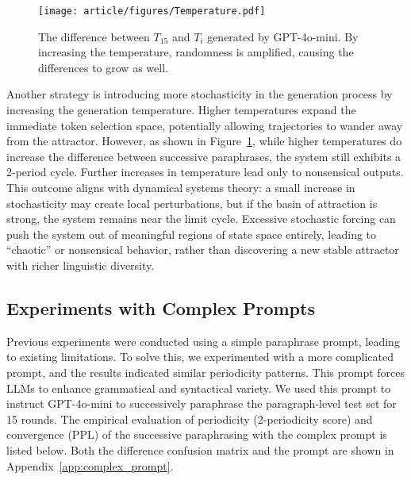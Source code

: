 

\begin{figure}[!h]
    \centering
    \texttt{[image: article/figures/Temperature.pdf]}
    \caption{
    The difference between \(T_{15}\) and \(T_i\) generated by GPT-4o-mini. 
    By increasing the temperature, randomness is amplified, causing the differences to grow as well.
    }    
    \label{figs:Temperature}
\end{figure}
Another strategy is introducing more stochasticity in the generation process by increasing the generation temperature. 
Higher temperatures expand the immediate token selection space, potentially allowing trajectories to wander away from the attractor. However, as shown in Figure~\ref{figs:Temperature}, while higher temperatures do increase the difference between successive paraphrases, the system still exhibits a 2-period cycle. 
Further increases in temperature lead only to nonsensical outputs.
This outcome aligns with dynamical systems theory: a small increase in stochasticity may create local perturbations, but if the basin of attraction is strong, the system remains near the limit cycle. 
Excessive stochastic forcing can push the system out of meaningful regions of state space entirely, leading to “chaotic” or nonsensical behavior, rather than discovering a new stable attractor with richer linguistic diversity.



\subsection{Experiments with Complex Prompts}
Previous experiments were conducted using a simple paraphrase prompt, leading to existing limitations. To solve this, we experimented with a more complicated prompt, and the results indicated similar periodicity patterns. This prompt forces LLMs to enhance grammatical and syntactical variety. 
We used this prompt to instruct GPT-4o-mini to successively paraphrase the paragraph-level test set for 15 rounds. The empirical evaluation of periodicity (2-periodicity score) and convergence (PPL) of the successive paraphrasing with the complex prompt is listed below. Both the difference confusion matrix and the prompt are shown in  Appendix~\ref{app:complex_prompt}.

